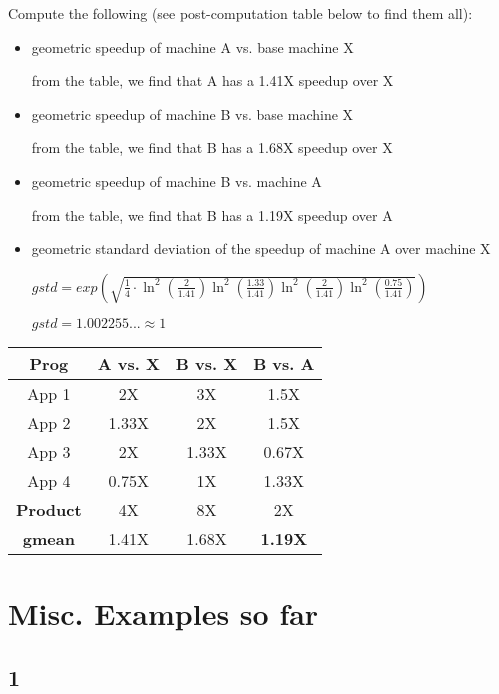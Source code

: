 \documentclass[12pt]{article}
\begin{document}
	Compute the following (see post-computation table below to find them all):

	\begin{itemize}
		\item geometric speedup of machine A vs. base machine X
		
		from the table, we find that A has a 1.41X speedup over X

		\item geometric speedup of machine B vs. base machine X
		
		from the table, we find that B has a 1.68X speedup over X

		\item geometric speedup of machine B vs. machine A
		
		from the table, we find that B has a 1.19X speedup over A

		\item geometric standard deviation of the speedup of machine A over machine X
		
		$gstd = exp(\sqrt{\frac{1}{4} \cdot \ln^2(\frac{2}{1.41}) \ln^2(\frac{1.33}{1.41}) \ln^2(\frac{2}{1.41}) \ln^2(\frac{0.75}{1.41})})$

		$gstd = 1.002255... \approx 1$

	\end{itemize}

	\begin{tabular}[h!]{|c|c|c|c|} \hline
		Prog		& A vs. X	& B vs. X	& B vs. A	\\ \hline
		App 1		& 2X		& 3X		& 1.5X		\\ \hline
		App 2		& 1.33X		& 2X		& 1.5X		\\ \hline
		App 3		& 2X		& 1.33X		& 0.67X		\\ \hline
		App 4		& 0.75X		& 1X		& 1.33X		\\ \hline
		\bf{Product}& 4X		& 8X		& 2X		\\ \hline
		\bf{gmean}	& 1.41X		& 1.68X		& \bf{1.19X}\\ \hline
	\end{tabular}

    \section{Misc. Examples so far}

    \subsection{1}
\end{document}
